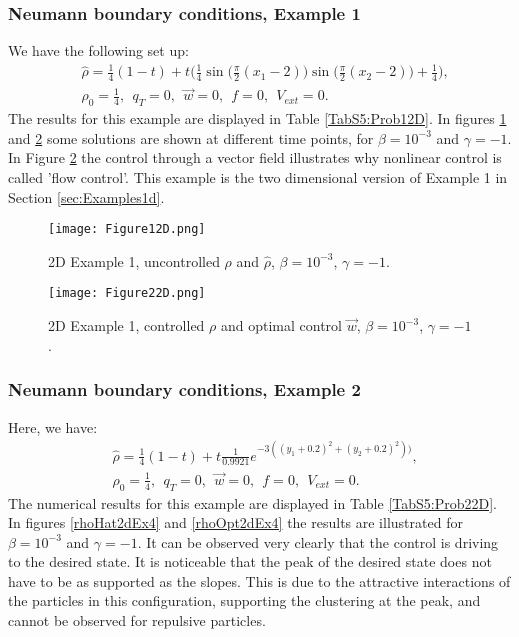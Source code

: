 \subsubsection{Neumann boundary conditions, Example 1}	
We have the following set up:
\begin{align*}
&\widehat \rho = \frac{1}{4}(1-t) + t\bigg(\frac{1}{4}\sin \bigg(\frac{\pi}{2}(x_1 - 2)\bigg)\sin \bigg(\frac{\pi}{2}(x_2 - 2)\bigg) + \frac{1}{4}\bigg),\\
&\rho_0 = \frac{1}{4},\ \
q_{T} = 0,\ \
\vec{w} = 0,\ \
f =0,\ \
V_{ext} =0.
\end{align*}
The results for this example are displayed in Table \ref{TabS5:Prob12D}. In figures \ref{rhoHat2dEx2} and \ref{rhoOpt2dEx2} some solutions are shown at different time points, for $\beta = 10^{-3}$ and $\gamma = -1$. In Figure \ref{rhoOpt2dEx2} the control through a vector field illustrates why nonlinear control is called 'flow control'. This example is the two dimensional version of Example 1 in Section \ref{sec:Examples1d}. 


\begin{figure}[h]
	\texttt{[image: Figure12D.png]}
	\caption{2D Example 1, uncontrolled $\rho$ and $\widehat \rho$, $\beta = 10^{-3}$, $\gamma = -1$.}
	\label{rhoHat2dEx2}
\end{figure}
\begin{figure}[h]
	\texttt{[image: Figure22D.png]}
	\caption{2D Example 1, controlled $\rho$ and optimal control $\vec{w}$, $\beta = 10^{-3}$, $\gamma = -1$.}
	\label{rhoOpt2dEx2}
\end{figure}


\subsubsection{Neumann boundary conditions, Example 2}	
Here, we have:
\begin{align*}
&\widehat \rho = \frac{1}{4}(1-t) + t\frac{1}{0.9921}e^{-3((y_1+0.2)^2 + (y_2+0.2)^2))},\\
&\rho_0 = \frac{1}{4},\ \
q_{T} = 0,\ \
\vec{w} = 0,\ \
f =0,\ \
V_{ext} =0.
\end{align*}
The numerical results for this example are displayed in Table \ref{TabS5:Prob22D}. In figures \ref{rhoHat2dEx4} and \ref{rhoOpt2dEx4} the results are illustrated for $\beta = 10^{-3}$ and $\gamma = -1$. It can be observed very clearly that the control is driving to the desired state. It is noticeable that the peak of the desired state does not have to be as supported as the slopes. This is due to the attractive interactions of the particles in this configuration, supporting the clustering at the peak, and cannot be observed for repulsive particles.


